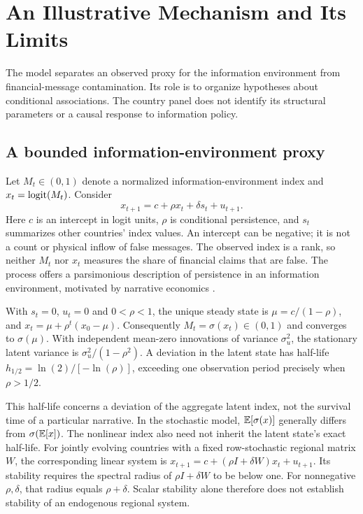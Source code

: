 \section{An Illustrative Mechanism and Its Limits}\label{sec:model}

The model separates an observed proxy for the information environment from
financial-message contamination. Its role is to organize hypotheses about
conditional associations. The country panel does not identify its structural
parameters or a causal response to information policy.

\subsection{A bounded information-environment proxy}\label{subsec:state}
Let $M_t\in(0,1)$ denote a normalized information-environment index and
$x_t=\operatorname{logit}(M_t)$. Consider
\begin{equation}\label{eq:state}
 x_{t+1}=c+\rho x_t+\delta s_t+u_{t+1}.
\end{equation}
Here $c$ is an intercept in logit units, $\rho$ is conditional persistence,
and $s_t$ summarizes other countries' index values. An intercept can be
negative; it is not a count or physical inflow of false messages. The
observed index is a rank, so neither $M_t$ nor $x_t$ measures the share of
financial claims that are false. The process offers a parsimonious description
of persistence in an information environment, motivated by narrative economics
\citep{shiller2017narrative,shiller2019narrative}.

\begin{proposition}\label{prop:state}
With $s_t=0$, $u_t=0$ and $0<\rho<1$, the unique steady state is
$\mu=c/(1-\rho)$, and
$x_t=\mu+\rho^t(x_0-\mu)$. Consequently $M_t=\sigma(x_t)\in(0,1)$ and
converges to $\sigma(\mu)$. With independent mean-zero innovations of
variance $\sigma_u^2$, the stationary latent variance is
$\sigma_u^2/(1-\rho^2)$. A deviation in the latent state has half-life
$h_{1/2}=\ln(2)/[-\ln(\rho)]$, exceeding one observation period precisely
when $\rho>1/2$.
\end{proposition}

This half-life concerns a deviation of the aggregate latent index, not the
survival time of a particular narrative. In the stochastic model,
$\mathbb{E}[\sigma(x)]$ generally differs from $\sigma(\mathbb{E}[x])$. The nonlinear
index also need not inherit the latent state's exact half-life.
For jointly evolving countries with a fixed row-stochastic regional matrix
$W$, the corresponding linear system is
$x_{t+1}=c+(\rho I+\delta W)x_t+u_{t+1}$. Its stability requires the
spectral radius of $\rho I+\delta W$ to be below one. For nonnegative
$\rho,\delta$, that radius equals $\rho+\delta$. Scalar stability alone
therefore does not establish stability of an endogenous regional system.

